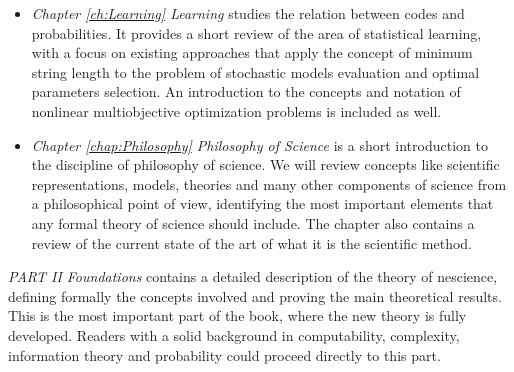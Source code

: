 \begin{itemize}
\item \emph{Chapter \ref{ch:Learning} Learning} studies the relation between codes and probabilities. It provides a short review of the area of statistical learning, with a focus on existing approaches that apply the concept of minimum string length to the problem of stochastic models evaluation and optimal parameters selection. An introduction to the concepts and notation of nonlinear multiobjective optimization problems is included as well. 

\item \emph{Chapter \ref{chap:Philosophy} Philosophy of Science} is a short introduction to the discipline of philosophy of science. We will review concepts like scientific representations, models, theories and many other components of science from a philosophical point of view, identifying the most important elements that any formal theory of science should include. The chapter also contains a review of the current state of the art of what it is the scientific method.

\end{itemize}

\bigskip

\emph{PART II Foundations} contains a detailed description of the theory of nescience, defining formally the concepts involved and proving the main theoretical results. This is the most important part of the book, where the new theory is fully developed. Readers with a solid background in computability, complexity, information theory and probability could proceed directly to this part.

